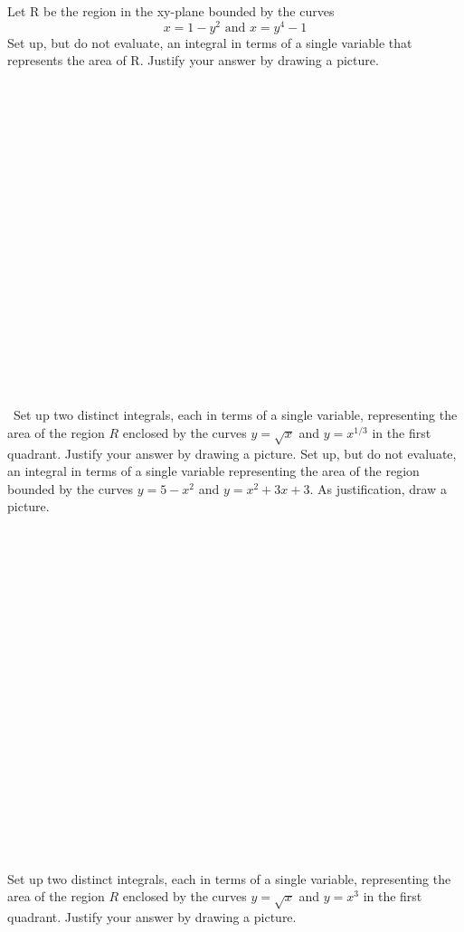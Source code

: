 \documentclass[11pt]{exam}
\theoremstyle{quest}
\begin{document}
\begin{questions}
\question[3]  Let R be the region in the xy-plane bounded by the curves
$$x = 1 - y^2\,\, \mbox{and} \,\,x = y^4- 1$$
Set up, but do not evaluate, an integral in terms of a single variable that represents the area of R. Justify your answer by drawing a picture.
\\\\\\\\\\\\\\\\\\\\\\\\\\\\\\\\\\\\\\\\\
\question[3]Set up two distinct integrals, each in terms of a single variable, representing the area of the region $R$ enclosed by the curves 
 $y=\sqrt{x}$ and $y=x^{1/3}$  in the first quadrant. Justify your answer by drawing a picture.
\newpage
\question[3]Set up, but do not evaluate, an integral in terms of a single variable representing the area of the region bounded by the curves $y=5-x^2$ and $y=x^2+3x+3$. As justification, draw a picture.
\\\\\\\\\\\\\\\\\\\\\\\\\\\\\\\\\\\\\\\\\\
\question[3] Set up two distinct integrals, each in terms of a single variable, representing the area of the region $R$ enclosed by the curves 
 $y=\sqrt{x}$ and $y=x^3$  in the first quadrant. Justify your answer by drawing a picture.
\end{questions}
\end{document}
